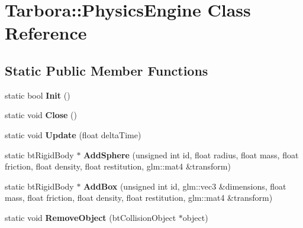 \hypertarget{classTarbora_1_1PhysicsEngine}{}\section{Tarbora\+:\+:Physics\+Engine Class Reference}
\label{classTarbora_1_1PhysicsEngine}
\subsection*{Static Public Member Functions}
\begin{DoxyCompactItemize}
\item 
\mbox{\label{classTarbora_1_1PhysicsEngine_a7ec00bd287d1366ce059f2821b023634}} 
static bool {\bfseries Init} ()
\item 
\mbox{\label{classTarbora_1_1PhysicsEngine_ae7c68706207e34b87dabf53fbf6886d1}} 
static void {\bfseries Close} ()
\item 
\mbox{\label{classTarbora_1_1PhysicsEngine_aecd7f940778147cff721cf877fefe046}} 
static void {\bfseries Update} (float delta\+Time)
\item 
\mbox{\label{classTarbora_1_1PhysicsEngine_a0a4d9d85104abee858af7f74dfc7213a}} 
static bt\+Rigid\+Body $\ast$ {\bfseries Add\+Sphere} (unsigned int id, float radius, float mass, float friction, float density, float restitution, glm\+::mat4 \&transform)
\item 
\mbox{\label{classTarbora_1_1PhysicsEngine_a948faad823ce1e338a86d61c226e679e}} 
static bt\+Rigid\+Body $\ast$ {\bfseries Add\+Box} (unsigned int id, glm\+::vec3 \&dimensions, float mass, float friction, float density, float restitution, glm\+::mat4 \&transform)
\item 
\mbox{\label{classTarbora_1_1PhysicsEngine_a4debfab1c812e22ccd4f65b0b7e9cea7}} 
static void {\bfseries Remove\+Object} (bt\+Collision\+Object $\ast$object)
\item 
\mbox{\label{classTarbora_1_1PhysicsEngine_a83b98f62953485af3b5e04d6bf4adba9}} 

\end{DoxyCompactItemize}
